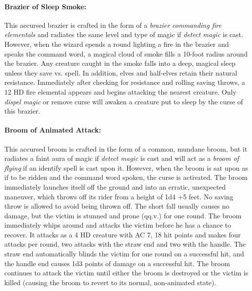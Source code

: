\begin{multicols}{2}
\paragraph{Brazier of Sleep Smoke:} This accursed brazier is crafted in the form of a \textit{brazier commanding fire elementals} and radiates the same level and type of magic if \textit{detect magic} is cast.  However, when the wizard spends a round lighting a fire in the brazier and speaks the command word, a magical cloud of smoke fills a 10-foot radius around the brazier.  Any creature caught in the smoke falls into a deep, magical sleep unless they save vs. spell.  In addition, elves and half-elves retain their natural resistance.  Immediately after checking for resistance and rolling saving throws, a 12 HD fire elemental appears and begins attacking the nearest creature.  Only \textit{dispel magic} or remove curse will awaken a creature put to sleep by the curse of this brazier.

\paragraph{Broom of Animated Attack:} This accursed broom is crafted in the form of a common, mundane broom, but it radiates a faint aura of magic if \textit{detect magic} is cast and will act as a \textit{broom of flying} if an identify spell is cast upon it.  However, when the broom is sat upon as if to be ridden and the command word spoken, the curse is activated.  The broom immediately launches itself off the ground and into an erratic, unexpected maneuver, which throws off its rider from a height of 1d4 +5 feet.   No saving throw is allowed to avoid being thrown off.  The short fall usually causes no damage, but the victim is stunned and prone (qq.v.) for one round.  The broom immediately whips around and attacks the victim before he has a chance to recover.  It attacks as a 4 HD creature with AC 7, 18 hit points and makes four attacks per round, two attacks with the straw end and two with the handle.  The straw end automatically blinds the victim for one round on a successful hit, and the handle end causes 1d3 points of damage on a successful hit.  The broom continues to attack the victim until either the broom is destroyed or the victim is killed (causing the broom to revert to its normal, non-animated state).


\end{multicols}
